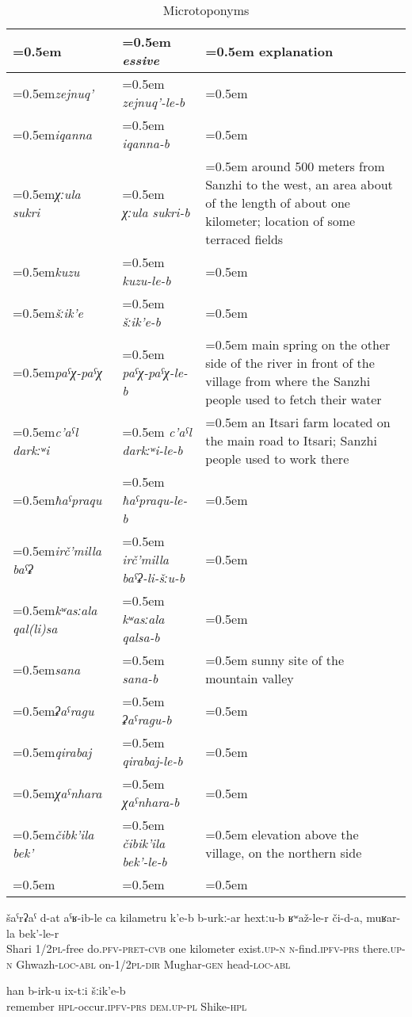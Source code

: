 \begin{table}
	\caption{Microtoponyms}
	\label{tab:Microtoponyms}
	\small
	\begin{tabularx}{0.98\textwidth}[]{%
		>{\raggedright\arraybackslash\hangindent=0.5em\itshape}p{60pt}
		>{\raggedright\arraybackslash\hangindent=0.5em\itshape}p{85pt}
		>{\raggedright\arraybackslash\hangindent=0.5em}X}
		
		\lsptoprule
		\upshape \isit{microtoponym}	&	\upshape essive 	&	explanation\\
		\midrule
		zejnuq' 		&	zejnuq'-le-b 		&	\\
		iqanna		&	iqanna-b		&	\\
		χːula sukri		&	χːula sukri-b		&	around 500 meters from Sanzhi to the west, an area about of the length of about one kilometer; location of some terraced fields\\
		kuzu			&	kuzu-le-b		&	\\
		šːik'e			&	šːik'e-b		&	\\
		paˁχ-paˁχ		&	paˁχ-paˁχ-le-b 	&	main spring on the other side of the river in front of the village from where the Sanzhi people used to fetch their water\\ 
		c'aˁl darkːʷi 		&	c'aˁl darkːʷi-le-b	&	an Itsari farm located on the main road to Itsari; Sanzhi people used to work there\\
		ħaˁpraqu 		&	ħaˁpraqu-le-b	&	\\
		irč'milla baˁʡ		&	irč'milla baˁʡ-li-šːu-b	&	\\
		kʷasːala qal(li)sa	&	kʷasːala qalsa-b 	&	\\
		sana			&	sana-b		&	sunny site of the mountain valley\\
		ʡaˁragu 		&	ʡaˁragu-b		&	\\
		qirabaj		&	qirabaj-le-b		&	\\
		χaˁnhara 		&	χaˁnhara-b		&	\\
		čibk'ila bek'		&	čibik'ila bek'-le-b	&	elevation above the village, on the northern side\\
		\lspbottomrule
	\end{tabularx}
\end{table}

\begin{exe}
	\ex	\label{ex:They sent us to Shari it is probably one kilometer}
	\gll	šaˁrʡaˁ	d-at	aˁʁ-ib-le	ca	kilametru	k'e-b	b-urkː-ar	hextːu-b		ʁʷaž-le-r	či-d-a,	muʁar-la	bek'-le-r   \\
		Shari	1/2\textsc{pl}-free	do.\textsc{pfv-pret-cvb}		one	kilometer	exist.\textsc{up-n}	\textsc{n}-find.\textsc{ipfv-prs}	there.\textsc{up-n}	Ghwazh-\textsc{loc-abl}	on-1/2\textsc{pl-dir} Mughar-\textsc{gen}	head-\textsc{loc-abl}\\
	\glt	{}

	\ex	\label{ex:As I remember they were in Shike}
	\gll	han b-irk-u	ix-tːi	šːik'e-b  \\
		remember \textsc{hpl}-occur.\textsc{ipfv-prs}	\textsc{dem.up}-\textsc{pl}	Shike-\textsc{hpl}\\
	\glt	{}
\end{exe}
